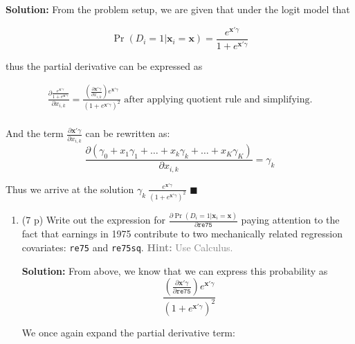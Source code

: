\documentclass[
]{article}
\begin{document}
\begin{enumerate}
\begin{enumerate}
\begin{enumerate}
      \textbf{Solution:} From the problem setup, we are given that under
      the logit model that

      \[
           \Pr(D_i=1|\mathbf{x}_{i}=\mathbf{x}) = \frac{e^{\mathbf{x}'\gamma}}{1+ e^{\mathbf{x}'\gamma}}
       \]

      thus the partial derivative can be expressed as

      \begin{align*}
           \frac{\partial \frac{e^{\mathbf{x}'\gamma}}{1+ e^{\mathbf{x}'\gamma}}}{\partial x_{i,k}} = \frac{\left(\frac{\partial \mathbf{x}'\gamma}{\partial x_{i, k}}\right)e^{\mathbf{x}'\gamma}}{\left(1 + e^{\mathbf{x}'\gamma}\right)^2} \text{ after applying quotient rule and simplifying.} \\
       \end{align*}

      And the term
      \(\frac{\partial \mathbf{x}'\gamma}{\partial x_{i, k}}\) can be
      rewritten as: \[
           \frac{\partial (\gamma_0 + x_1 \gamma_1 + \ldots + x_k\gamma_k + \ldots + x_K\gamma_K)}{\partial x_{i, k}} = \gamma_k
       \]

      Thus we arrive at the solution
      \(\gamma_k \ \frac{e^{\mathbf{x}'\gamma}}{\left(1 + e^{\mathbf{x}'\gamma}\right)^2}\)
      \hfill \(\blacksquare\)
    \end{enumerate}

    \newpage

    \begin{enumerate}
    \def\labelenumiii{\roman{enumiii}.}
    \setcounter{enumiii}{1}
    \item
      (7 p) Write out the expression for
      \(\frac{\partial \Pr(D_i=1|\mathbf{x}_{i}=\mathbf{x})}{\partial \texttt{re75}}\)
      paying attention to the fact that earnings in 1975 contribute to
      two mechanically related regression covariates: \texttt{re75} and
      \texttt{re75sq}.
      \textcolor{gray}{\textbf{Hint:} Use Calculus.}\label{item:logit:delta-pscore-re75}

      \textbf{Solution:} From above, we know that we can express this
      probability as \[\
          \frac{\left(\frac{\partial \mathbf{x}'\gamma}{\partial \texttt{re75}}\right)e^{\mathbf{x}'\gamma}}{\left(1 + e^{\mathbf{x}'\gamma}\right)^2}
      \]

      We once again expand the partial derivative term:


\end{enumerate}
\end{enumerate}
\end{enumerate}
\end{document}
